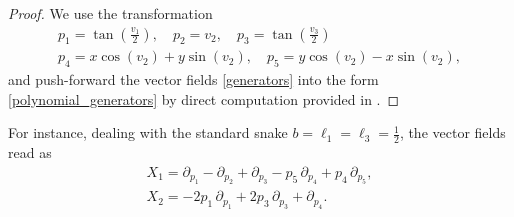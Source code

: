 \documentclass{amsart}
\theoremstyle{plain}
\theoremstyle{definition}
\theoremstyle{remark}
\begin{document}
\begin{proof}
    We use the transformation
    \begin{equation}\label{polynomial_coordinates}
    \begin{gathered}
        p_1 = \tan \left(\tfrac{v_1}{2}\right),\quad p_2 = v_2, \quad p_3 = \tan \left(\tfrac{v_3}{2}\right)\\
        p_4 = x \cos(v_2) + y \sin(v_2),\quad p_5 = y \cos(v_2) - x \sin(v_2),
    \end{gathered}
    \end{equation}
    and push-forward the vector fields \eqref{generators} into the form \eqref{polynomial_generators} by direct computation provided in \cite[\texttt{vectorfields.mw}]{attached_files}.
\end{proof}

For instance, dealing with the standard snake $b=\ell_1=\ell_3=\tfrac{1}{2}$, the vector fields read as
    \begin{gather*}
        X_1 = \partial_{p_1} - \partial_{p_2} + \partial_{p_3} - p_5\, \partial_{p_4} + p_4\, \partial_{p_5},\\
        X_2 = -2p_1\, \partial_{p_1} + 2p_3\, \partial_{p_3} + \partial_{p_4}.
    \end{gather*}
\end{document}

